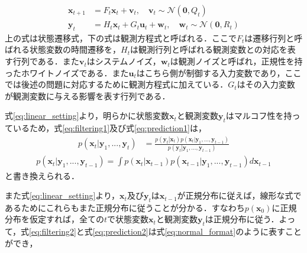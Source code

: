         \begin{equation}
            \label{eq:linear_setting}
            \begin{aligned}
                \bm{x}_{t+1} &= F_t \bm{x}_t + \bm{v}_t, \quad \bm{v}_t \sim \mathcal{N}(\bm{0}, Q_t)
                \\ \bm{y}_t &= H_t \bm{x}_t + G_t \bm{u}_t + \bm{w}_t, \quad \bm{w}_t \sim \mathcal{N}(\bm{0}, R_t)
            \end{aligned}        
        \end{equation}
        上の式は状態遷移式，下の式は観測方程式と呼ばれる．ここで$F_t$は遷移行列と呼ばれる状態変数の時間遷移を，$H_t$は観測行列と呼ばれる観測変数との対応を表す行列である．また$\bm{v}_t$はシステムノイズ，$\bm{w}_t$は観測ノイズと呼ばれ，正規性を持ったホワイトノイズである．また$\bm{u}_t$はこちら側が制御する入力変数であり，ここでは後述の問題に対応するために観測方程式に加えている．$G_t$はその入力変数が観測変数に与える影響を表す行列である．
        \par
        式\ref{eq:linear_setting}より，明らかに状態変数$\bm{x}_t$と観測変数$\bm{y}_t$はマルコフ性を持っているため，式\ref{eq:filtering1}及び式\ref{eq:prediction1}は，
        \begin{equation}
            \label{eq:filtering2}
            \begin{aligned}
                p(\left. \bm{x}_t \right| \bm{y}_1,..., \bm{y}_t ) &= \frac{p(\left. \bm{y}_t \right| \bm{x}_t) p(\left.\bm{x}_t\right| \bm{y}_1,..., \bm{y}_{t-1})}{p(\left.\bm{y}_t\right| \bm{y}_1,..., \bm{y}_{t-1})}
            \end{aligned}
        \end{equation}
        \begin{equation}
            \label{eq:prediction2}
            \begin{aligned}
                p(\left.\bm{x}_t\right| \bm{y}_1,..., \bm{y}_{t-1}) = \int p(\left.\bm{x}_t\right|\bm{x}_{t-1}) p(\left.\bm{x}_{t-1}\right| \bm{y}_1,..., \bm{y}_{t-1}) d\bm{x}_{t-1}
            \end{aligned}
        \end{equation}
        と書き換えられる．
        \par
        また式\ref{eq:linear_setting}より，$\bm{x}_t$及び$\bm{y}_t$は$\bm{x}_{t-1}$が正規分布に従えば，線形な式であるためにこれらもまた正規分布に従うことが分かる．すなわち$p(\bm{x}_0)$に正規分布を仮定すれば，全ての$t$で状態変数$\bm{x}_t$と観測変数$\bm{y}_t$は正規分布に従う．よって，式\ref{eq:filtering2}と式\ref{eq:prediction2}は式\ref{eq:normal_format}のように表すことができ，
